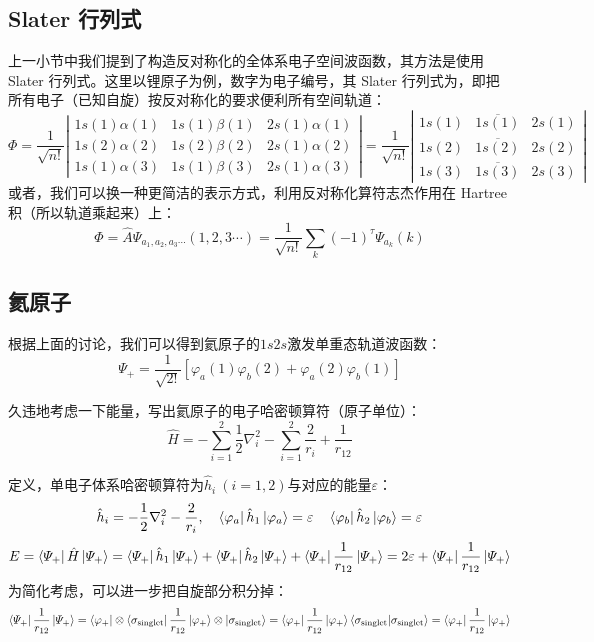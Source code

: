 \subsection{Slater 行列式}
上一小节中我们提到了构造反对称化的全体系电子空间波函数，其方法是使用 Slater 行列式。这里以锂原子为例，数字为电子编号，其 Slater 行列式为，即把所有电子（已知自旋）按反对称化的要求便利所有空间轨道：
\[\varPhi=\frac{1}{\sqrt{n!}}
\left |
\begin{array}{lll}
1s(1)\alpha(1) & 1s(1)\beta(1) & 2s(1)\alpha(1) \\
1s(2)\alpha(2) & 1s(2)\beta(2) & 2s(1)\alpha(2) \\
1s(1)\alpha(3) & 1s(1)\beta(3) & 2s(1)\alpha(3)
\end{array}
\right |
=\frac{1}{\sqrt{n!}}
\left |
\begin{array}{lll}
1s(1) & \overline{1s(1)} & 2s(1) \\
1s(2) & \overline{1s(2)} & 2s(2) \\
1s(3) & \overline{1s(3)} & 2s(3)
\end{array}
\right |
\]
或者，我们可以换一种更简洁的表示方式，利用反对称化算符志杰作用在 Hartree 积（所以轨道乘起来）上：
\[\varPhi=\hat{A}\varPsi_{a_1,a_2,a_3 \cdots}(1,2,3\cdots)=\frac{1}{\sqrt{n!}}\sum_k(-1)^{\tau}\varPsi_{a_k}(k)\]

\subsection{氦原子}
根据上面的讨论，我们可以得到氦原子的$1s2s$激发单重态轨道波函数：
\[\varPsi_{+}=\frac{1}{\sqrt{2!}}[\varphi_a(1)\varphi_b(2)+\varphi_a(2)\varphi_b(1)]\]

久违地考虑一下能量，写出氦原子的电子哈密顿算符（原子单位）：
\[\hat{H}=-\sum_{i=1}^2\frac{1}{2}\nabla^2_i-\sum_{i=1}^2\frac{2}{r_{i}}+\frac{1}{r_{12}}\]

定义，单电子体系哈密顿算符为$\hat{h}_i \ (i=1,2)$与对应的能量$\varepsilon$：
\[\hat{h}_i=-\frac{1}{2}\nabla^2_i-\frac{2}{r_{i}}, \quad \bra{\varphi_a}\hat{h}_1\ket{\varphi_a}=\varepsilon \quad \bra{\varphi_b}\hat{h}_2\ket{\varphi_b}=\varepsilon\]
\[E=\bra{\varPsi_{+}}\hat{H}\ket{\varPsi_{+}}=\bra{\varPsi_{+}}\hat{h}_1\ket{\varPsi_{+}}+\bra{\varPsi_{+}}\hat{h}_2\ket{\varPsi_{+}}+\bra{\varPsi_{+}}\frac{1}{r_{12}}\ket{\varPsi_{+}}=2\varepsilon+\bra{\varPsi_{+}}\frac{1}{r_{12}}\ket{\varPsi_{+}}\]
为简化考虑，可以进一步把自旋部分积分掉：
\[\bra{\varPsi_{+}}\frac{1}{r_{12}}\ket{\varPsi_{+}}=\bra{\varphi_{+}}\otimes\bra{\sigma_{\rm{singlet}}}\frac{1}{r_{12}}\ket{\varphi_{+}}\otimes\ket{\sigma_{\rm{singlet}}}=\bra{\varphi_{+}}\frac{1}{r_{12}}\ket{\varphi_{+}}\bra{\sigma_{\rm{singlet}}}\ket{\sigma_{\rm{singlet}}}=\bra{\varphi_{+}}\frac{1}{r_{12}}\ket{\varphi_{+}}\]

